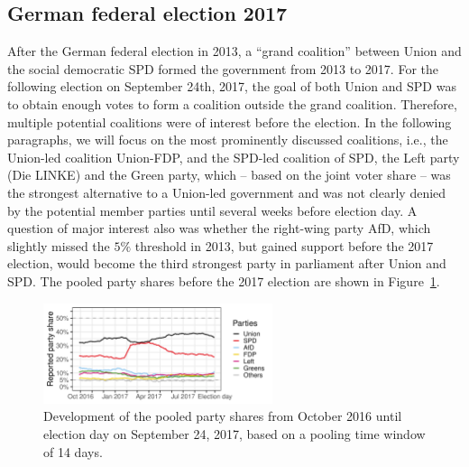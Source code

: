 \documentclass[smallcondensed]{svjour3_edited}     %
\begin{document}



\subsection{German federal election 2017} \label{subsec:2017}
After the German federal election in 2013, a ``grand coalition'' between Union and the social
democratic SPD formed the government from 2013 to 2017.
For the following election on September 24th, 2017, the goal of both Union and SPD
was to obtain enough votes to form a coalition outside the grand
coalition. Therefore, multiple potential coalitions were of interest before the
election. In the following paragraphs, we will focus on the most prominently
discussed coalitions, i.e., the Union-led coalition Union-FDP, and the
SPD-led coalition of SPD, the Left party (Die LINKE) and the Green party, which
-- based on the joint voter share -- was the strongest alternative to a Union-led
government and was not clearly denied by the potential member parties until several weeks
before election day.
A question of major interest also was whether the right-wing party AfD, which
slightly missed the $5\%$ threshold in 2013, but gained support before the 2017 election,
would become the third strongest party in parliament after Union and SPD.
The pooled party shares before the 2017 election are shown in Figure~\ref{fig:2017}.

\begin{figure}[H]\centering
\includegraphics[width=0.6\textwidth]{fig_2017_pooled_rawShares.pdf}
\caption{Development of the pooled party shares from October 2016 until
election day on September 24, 2017, based on a pooling time window of 14 days.
\label{fig:2017}
}
\end{figure}
\end{document}
